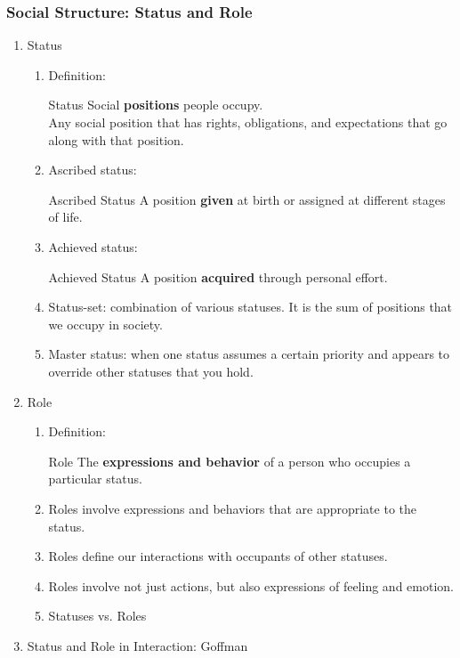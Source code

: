 \documentclass[12pt,a4paper]{article}
\begin{document}
\subsubsection{Social Structure: Status and Role}
\begin{enumerate}
	\item Status
	\begin{enumerate}
		\item Definition: 
		\begin{df}{Status}
			Social \textbf{positions} people occupy. \\
			Any social position that has rights, obligations, and expectations that go along with that position. 
		\end{df}
		\item Ascribed status: 
		\begin{df}{Ascribed Status}
			A position \textbf{given} at birth or assigned at different stages of life. 
		\end{df}
		\item Achieved status: 
		\begin{df}{Achieved Status}
			A position \textbf{acquired} through personal effort. 
		\end{df}
		\item Status-set: combination of various statuses. It is the sum of positions that we occupy in society. 
		\item Master status: when one status assumes a certain priority and appears to override other statuses that you hold. 
	\end{enumerate}
	\item Role
	\begin{enumerate}
		\item Definition: 
		\begin{df}{Role}
			The \textbf{expressions and behavior} of a person who occupies a particular status. 
		\end{df}
		\item Roles involve expressions and behaviors that are appropriate to the status. 
		\item Roles define our interactions with occupants of other statuses. 
		\item Roles involve not just actions, but also expressions of feeling and emotion. 
		\item Statuses vs. Roles
	\end{enumerate}
	\item Status and Role in Interaction: Goffman
	\begin{enumerate}

\end{enumerate}
\end{enumerate}
\end{document}
